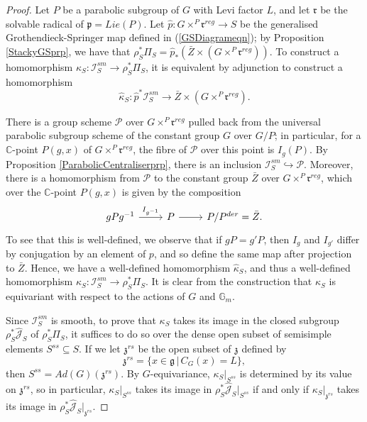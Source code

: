 \documentclass{amsart}
\theoremstyle{remark}
\numberwithin{theorem}{section}
\numberwithin{equation}{section}
\begin{document}
\begin{proof} 
Let $P$ be a parabolic subgroup of $G$ with Levi factor $L$, and let $\mathfrak{r}$ be the solvable radical of $\mathfrak{p} = Lie(P)$. Let $\hat{p}:G \times^P\mathfrak{r}^{reg} \rightarrow S$ be the generalised Grothendieck-Springer map defined in (\ref{GSDiagrameqn}); by Proposition \ref{StackyGSprp}, we have that $\rho_S^* \Pi_S = \hat{p}_*(\bar{Z} \times (G \times^P \mathfrak{r}^{reg}))$. To construct a homomorphism $\kappa_S:\mathcal I^{sm}_S \rightarrow \mathcal \rho_S^*\Pi_S$, it is equivalent by adjunction to construct a homomorphism
\begin{equation}\label{CameralHomLifteqn}
    \hat{\kappa}_S:\hat{p}^*\mathcal I^{sm}_S \rightarrow \bar{Z} \times (G \times^P \mathfrak{r}^{reg}).
\end{equation}

There is a group scheme $\mathcal P$ over $G \times^P \mathfrak{r}^{reg}$ pulled back from the universal parabolic subgroup scheme of the constant group $G$ over $G/P$; in particular, for a $\mathbb{C}$-point $P(g,x)$ of $G \times^P \mathfrak{r}^{reg}$, the fibre of $\mathcal P$ over this point is $I_g(P)$. By Proposition \ref{ParabolicCentraliserprp}, there is an inclusion $\mathcal I_S^{sm} \hookrightarrow \mathcal P$. Moreover, there is a homomorphism from $\mathcal P$ to the constant group $\bar{Z}$ over $G \times^P \mathfrak{r}^{reg}$, which over the $\mathbb{C}$-point $P(g,x)$ is given by the composition
\begin{equation}\label{CameralHom1eqn}
\begin{tikzcd}
gPg^{-1} \arrow[r, "I_{g^{-1}}"] & P \arrow[r] & P/P^{der} = \bar{Z}. 
\end{tikzcd}
\end{equation}
To see that this is well-defined, we observe that if $gP = g'P$, then $I_g$ and $I_{g'}$ differ by conjugation by an element of $p$, and so define the same map after projection to $\bar{Z}$. Hence, we have a well-defined homomorphism $\hat{\kappa}_S$, and thus a well-defined homomorphism $\kappa_S:\mathcal I^{sm}_S \rightarrow \rho_S^*\Pi_S$. It is clear from the construction that $\kappa_S$ is equivariant with respect to the actions of $G$ and $\mathbb{G}_m$.

Since $\mathcal I_S^{sm}$ is smooth, to prove that $\kappa_S$ takes its image in the closed subgroup $\rho_S^* \hat{\mathcal J}_S$ of $\rho_S^*\Pi_S$, it suffices to do so over the dense open subset of semisimple elements $S^{ss} \subseteq S$. If we let $\mathfrak{z}^{rs}$ be the open subset of $\mathfrak{z}$ defined by
\begin{equation}\label{WeylLeviActioneqn}
    \mathfrak{z}^{rs} = \{ x \in \mathfrak{g} \, | \,C_G(x) = L \},
\end{equation}
then $S^{ss} = Ad(G)(\mathfrak{z}^{rs})$. By $G$-equivariance, $\kappa_S|_{S^{ss}}$ is determined by its value on $\mathfrak{z}^{rs}$, so in particular, $\kappa_S|_{S^{ss}}$ takes its image in $\rho_S^* \hat{\mathcal J}_S|_{S^{ss}}$ if and only if $\kappa_S|_{\mathfrak{z}^{rs}}$ takes its image in $\rho_S^* \hat{\mathcal J}_S|_{\mathfrak{z}^{rs}}$. 


\end{proof}
\end{document}
